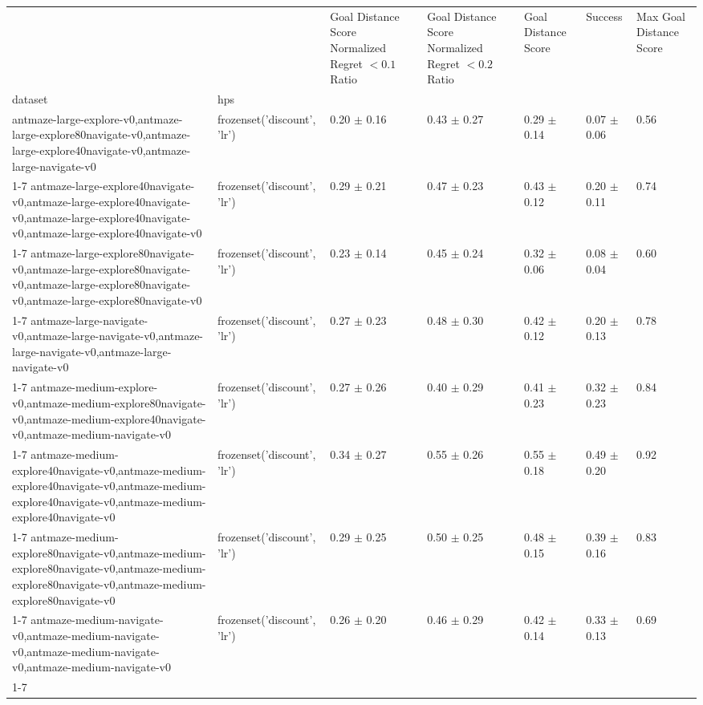 \begin{tabular}{lllllll}
\toprule
 &  & Goal Distance Score Normalized Regret $< 0.1$ Ratio & Goal Distance Score Normalized Regret $< 0.2$ Ratio & Goal Distance Score & Success & Max Goal Distance Score \\
dataset & hps &  &  &  &  &  \\
\midrule
antmaze-large-explore-v0,antmaze-large-explore80navigate-v0,antmaze-large-explore40navigate-v0,antmaze-large-navigate-v0 & frozenset({'discount', 'lr'}) & 0.20 $\pm$ 0.16 & 0.43 $\pm$ 0.27 & 0.29 $\pm$ 0.14 & 0.07 $\pm$ 0.06 & 0.56 \\
\cline{1-7}
antmaze-large-explore40navigate-v0,antmaze-large-explore40navigate-v0,antmaze-large-explore40navigate-v0,antmaze-large-explore40navigate-v0 & frozenset({'discount', 'lr'}) & 0.29 $\pm$ 0.21 & 0.47 $\pm$ 0.23 & 0.43 $\pm$ 0.12 & 0.20 $\pm$ 0.11 & 0.74 \\
\cline{1-7}
antmaze-large-explore80navigate-v0,antmaze-large-explore80navigate-v0,antmaze-large-explore80navigate-v0,antmaze-large-explore80navigate-v0 & frozenset({'discount', 'lr'}) & 0.23 $\pm$ 0.14 & 0.45 $\pm$ 0.24 & 0.32 $\pm$ 0.06 & 0.08 $\pm$ 0.04 & 0.60 \\
\cline{1-7}
antmaze-large-navigate-v0,antmaze-large-navigate-v0,antmaze-large-navigate-v0,antmaze-large-navigate-v0 & frozenset({'discount', 'lr'}) & 0.27 $\pm$ 0.23 & 0.48 $\pm$ 0.30 & 0.42 $\pm$ 0.12 & 0.20 $\pm$ 0.13 & 0.78 \\
\cline{1-7}
antmaze-medium-explore-v0,antmaze-medium-explore80navigate-v0,antmaze-medium-explore40navigate-v0,antmaze-medium-navigate-v0 & frozenset({'discount', 'lr'}) & 0.27 $\pm$ 0.26 & 0.40 $\pm$ 0.29 & 0.41 $\pm$ 0.23 & 0.32 $\pm$ 0.23 & 0.84 \\
\cline{1-7}
antmaze-medium-explore40navigate-v0,antmaze-medium-explore40navigate-v0,antmaze-medium-explore40navigate-v0,antmaze-medium-explore40navigate-v0 & frozenset({'discount', 'lr'}) & 0.34 $\pm$ 0.27 & 0.55 $\pm$ 0.26 & 0.55 $\pm$ 0.18 & 0.49 $\pm$ 0.20 & 0.92 \\
\cline{1-7}
antmaze-medium-explore80navigate-v0,antmaze-medium-explore80navigate-v0,antmaze-medium-explore80navigate-v0,antmaze-medium-explore80navigate-v0 & frozenset({'discount', 'lr'}) & 0.29 $\pm$ 0.25 & 0.50 $\pm$ 0.25 & 0.48 $\pm$ 0.15 & 0.39 $\pm$ 0.16 & 0.83 \\
\cline{1-7}
antmaze-medium-navigate-v0,antmaze-medium-navigate-v0,antmaze-medium-navigate-v0,antmaze-medium-navigate-v0 & frozenset({'discount', 'lr'}) & 0.26 $\pm$ 0.20 & 0.46 $\pm$ 0.29 & 0.42 $\pm$ 0.14 & 0.33 $\pm$ 0.13 & 0.69 \\
\cline{1-7}
\bottomrule
\end{tabular}
